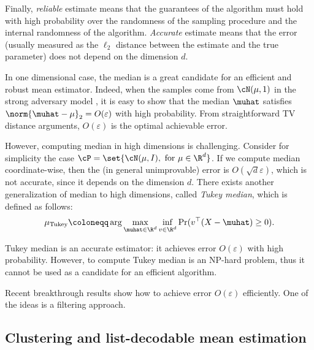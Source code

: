 Finally, \emph{reliable} estimate means that the guarantees of the algorithm must hold with high probability over the randomness of the sampling procedure and the internal randomness of the algorithm.
\emph{Accurate} estimate means that the error (usually measured as the \(\ell_2\) distance between the estimate and the true parameter)
does not depend on the dimension \(d\).

In one dimensional case, the median is a great candidate for an efficient and robust mean estimator. 
Indeed, when the samples come from \(\cN(\mu, 1)\) in the strong adversary model , 
it is easy to show that the median \(\muhat\) satisfies \(\norm{\muhat - \mu}_2 = O(\varepsilon)\) with high probability.
From straightforward TV distance arguments, \(O(\varepsilon)\) is the optimal achievable error.

However, computing median in high dimensions is challenging. 
Consider for simplicity the case \(\cP = \set{\cN(\mu, I), \text{ for } \mu \in \R^d}\).
If we compute median coordinate-wise, then the (in general unimprovable) error is \(O(\sqrt{d} \varepsilon)\), 
which is not accurate, since it depends on the dimension \(d\).
There exists another generalization of median to high dimensions, called \textit{Tukey median}, which is defined as follows:
\begin{equation}
    \mu_{\mathrm{Tukey}} \coloneqq \arg \max_{\muhat \in \R^d} \inf_{v \in \R^d} \Pr(v^\top (X - \muhat) \geq 0).
\end{equation}

Tukey median is an accurate estimator: it achieves error \(O(\varepsilon)\) with high probability. 
However, to compute Tukey median is an NP-hard problem, thus it cannot be used as a candidate for an efficient algorithm.

Recent breakthrough results  show how to achieve error \(O(\varepsilon)\) efficiently.
One of the ideas is a filtering approach.

\subsection{Clustering and list-decodable mean estimation}

